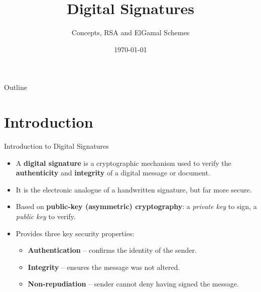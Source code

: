 \documentclass[aspectratio=169]{beamer}
\title[Digital Signatures]{Digital Signatures}
\subtitle{Concepts, RSA and ElGamal Schemes}
\author{}
\date{\today}
\begin{document}
\begin{frame}
  \titlepage
\end{frame}

\begin{frame}{Outline}
  \tableofcontents
\end{frame}

\section{Introduction}
\begin{frame}{Introduction to Digital Signatures}
  \begin{itemize}
    \item A \textbf{digital signature} is a cryptographic mechanism used to verify the \textbf{authenticity} and \textbf{integrity} of a digital message or document.
    \item It is the electronic analogue of a handwritten signature, but far more secure.
    \item Based on \textbf{public-key (asymmetric) cryptography}: a \emph{private key} to sign, a \emph{public key} to verify.
    \item Provides three key security properties:
    \begin{itemize}
      \item \textbf{Authentication} -- confirms the identity of the sender.
      \item \textbf{Integrity} -- ensures the message was not altered.
      \item \textbf{Non-repudiation} -- sender cannot deny having signed the message.
    \end{itemize}
  \end{itemize}
\end{frame}

\end{document}
